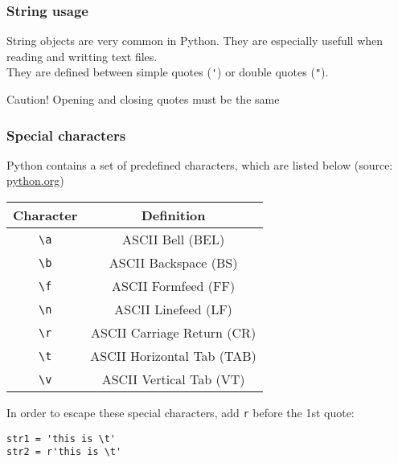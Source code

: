 \begin{frame}[fragile]
\frametitle{String usage}
String objects are very common in Python. They are especially usefull when reading and writting text files.\\

    \vspace{1em}
    They are defined between simple quotes (\verb+'+) or double quotes (\verb+"+). 

    \vspace{1em}
    \begin{alertblock}{Caution!}
        Opening and closing quotes must be the same
    \end{alertblock}
\end{frame}
    
\begin{frame}[fragile]
    \frametitle{Special characters}
    Python contains a set of predefined characters, which are listed below (source: \href{https://docs.python.org/3/reference/lexical_analysis.html}{python.org})

    \vspace{0.5em}
    \begin{center}
    \begin{tabular}{cc}
        Character &  Definition\\
        \hline
        \hline
        \verb+\a+ & ASCII Bell (BEL)\\
        \verb+\b+ & ASCII Backspace (BS)\\
        \verb+\f+ & ASCII Formfeed (FF)\\
        \verb+\n+ & ASCII Linefeed (LF)\\
        \verb+\r+ & ASCII Carriage Return (CR)\\
        \verb+\t+ & ASCII Horizontal Tab (TAB)\\
        \verb+\v+ & ASCII Vertical Tab (VT)\\
    \end{tabular}
    \end{center}

    \vspace{1em}
    In order to escape these special characters, add \verb+r+ before the 1st quote:
    \begin{lstlisting}[basicstyle=\ttfamily\scriptsize]
str1 = 'this is \t'
str2 = r'this is \t'
    \end{lstlisting}

\end{frame}

